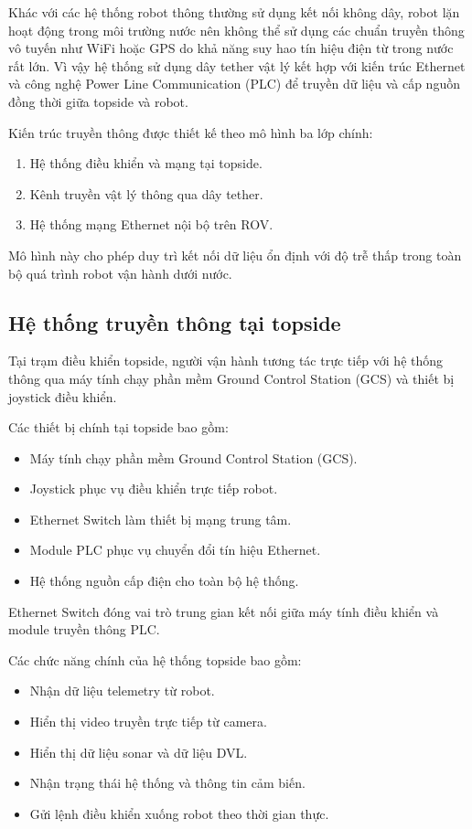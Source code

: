 \documentclass[../DoAn.tex]{subfiles}
\begin{document}
Khác với các hệ thống robot thông thường sử dụng kết nối không dây, robot lặn hoạt động trong môi trường nước nên không thể sử dụng các chuẩn truyền thông vô tuyến như WiFi hoặc GPS do khả năng suy hao tín hiệu điện từ trong nước rất lớn. Vì vậy hệ thống sử dụng dây tether vật lý kết hợp với kiến trúc Ethernet và công nghệ Power Line Communication (PLC) để truyền dữ liệu và cấp nguồn đồng thời giữa topside và robot.

Kiến trúc truyền thông được thiết kế theo mô hình ba lớp chính:

\begin{enumerate}
    \item Hệ thống điều khiển và mạng tại topside.
    \item Kênh truyền vật lý thông qua dây tether.
    \item Hệ thống mạng Ethernet nội bộ trên ROV.
\end{enumerate}

Mô hình này cho phép duy trì kết nối dữ liệu ổn định với độ trễ thấp trong toàn bộ quá trình robot vận hành dưới nước.

\subsection{Hệ thống truyền thông tại topside}

Tại trạm điều khiển topside, người vận hành tương tác trực tiếp với hệ thống thông qua máy tính chạy phần mềm Ground Control Station (GCS) và thiết bị joystick điều khiển.

Các thiết bị chính tại topside bao gồm:

\begin{itemize}
    \item Máy tính chạy phần mềm Ground Control Station (GCS).
    \item Joystick phục vụ điều khiển trực tiếp robot.
    \item Ethernet Switch làm thiết bị mạng trung tâm.
    \item Module PLC phục vụ chuyển đổi tín hiệu Ethernet.
    \item Hệ thống nguồn cấp điện cho toàn bộ hệ thống.
\end{itemize}

Ethernet Switch đóng vai trò trung gian kết nối giữa máy tính điều khiển và module truyền thông PLC.

Các chức năng chính của hệ thống topside bao gồm:

\begin{itemize}
    \item Nhận dữ liệu telemetry từ robot.
    \item Hiển thị video truyền trực tiếp từ camera.
    \item Hiển thị dữ liệu sonar và dữ liệu DVL.
    \item Nhận trạng thái hệ thống và thông tin cảm biến.
    \item Gửi lệnh điều khiển xuống robot theo thời gian thực.
\end{itemize}
\end{document}
